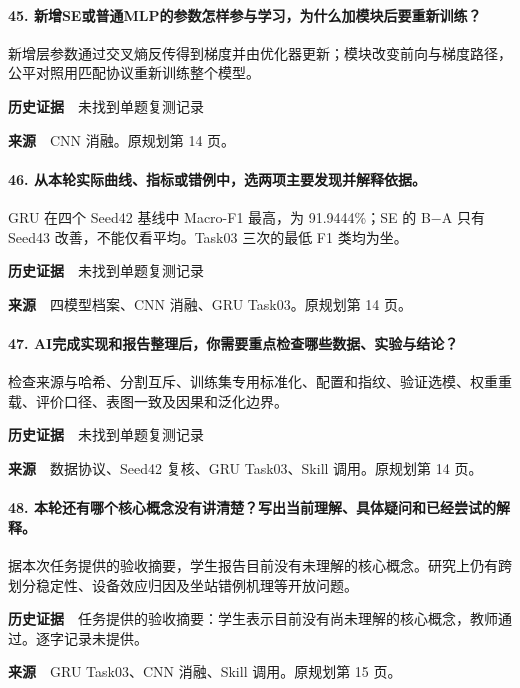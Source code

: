 \paragraph{45. 新增SE或普通MLP的参数怎样参与学习，为什么加模块后要重新训练？}
新增层参数通过交叉熵反传得到梯度并由优化器更新；模块改变前向与梯度路径，公平对照用匹配协议重新训练整个模型。\par
\textbf{历史证据}　未找到单题复测记录\par
\textbf{来源}　CNN 消融。原规划第 14 页。\par
\paragraph{46. 从本轮实际曲线、指标或错例中，选两项主要发现并解释依据。}
GRU 在四个 Seed42 基线中 Macro-F1 最高，为 91.9444\%；SE 的 B\(\mathord{-}\)A 只有 Seed43 改善，不能仅看平均。Task03 三次的最低 F1 类均为坐。\par
\textbf{历史证据}　未找到单题复测记录\par
\textbf{来源}　四模型档案、CNN 消融、GRU Task03。原规划第 14 页。\par
\paragraph{47. AI完成实现和报告整理后，你需要重点检查哪些数据、实验与结论？}
检查来源与哈希、分割互斥、训练集专用标准化、配置和指纹、验证选模、权重重载、评价口径、表图一致及因果和泛化边界。\par
\textbf{历史证据}　未找到单题复测记录\par
\textbf{来源}　数据协议、Seed42 复核、GRU Task03、Skill 调用。原规划第 14 页。\par
\paragraph{48. 本轮还有哪个核心概念没有讲清楚？写出当前理解、具体疑问和已经尝试的解释。}
据本次任务提供的验收摘要，学生报告目前没有未理解的核心概念。研究上仍有跨划分稳定性、设备效应归因及坐站错例机理等开放问题。\par
\textbf{历史证据}　任务提供的验收摘要：学生表示目前没有尚未理解的核心概念，教师通过。逐字记录未提供。\par
\textbf{来源}　GRU Task03、CNN 消融、Skill 调用。原规划第 15 页。\par
